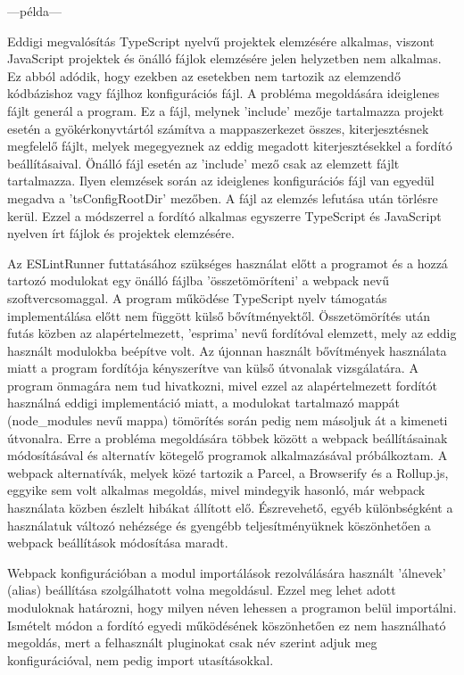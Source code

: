 ---példa---

Eddigi megvalósítás TypeScript nyelvű projektek elemzésére alkalmas, viszont JavaScript projektek és önálló fájlok elemzésére jelen helyzetben nem alkalmas. Ez abból adódik, hogy ezekben az esetekben nem tartozik az elemzendő kódbázishoz vagy fájlhoz konfigurációs fájl. A probléma megoldására ideiglenes fájlt generál a program. Ez a fájl, melynek 'include' mezője tartalmazza projekt esetén a gyökérkonyvtártól számítva a mappaszerkezet összes, kiterjesztésnek megfelelő fájlt, melyek megegyeznek az eddig megadott kiterjesztésekkel a fordító beállításaival. Önálló fájl esetén az 'include' mező csak az elemzett fájlt tartalmazza.
Ilyen elemzések során az ideiglenes konfigurációs fájl van egyedül megadva a 'tsConfigRootDir' mezőben. A fájl az elemzés lefutása után törlésre kerül.
Ezzel a módszerrel a fordító alkalmas egyszerre TypeScript és JavaScript nyelven írt fájlok és projektek elemzésére. 

Az ESLintRunner futtatásához szükséges használat előtt a programot és a hozzá tartozó modulokat egy önálló fájlba 'összetömöríteni' a webpack nevű szoftvercsomaggal. A program működése TypeScript nyelv támogatás implementálása előtt nem függött külső bővítményektől. Összetömörítés után futás közben az alapértelmezett, 'esprima' nevű fordítóval elemzett, mely az eddig használt modulokba beépítve volt. Az újonnan használt bővítmények használata miatt a program fordítója kényszerítve van külső útvonalak vizsgálatára. A program önmagára nem tud hivatkozni, mivel ezzel az alapértelmezett fordítót használná eddigi implementáció miatt, a modulokat tartalmazó mappát (node\_modules nevű mappa) tömörítés során pedig nem másoljuk át a kimeneti útvonalra. Erre a probléma megoldására többek között a webpack beállításainak módosításával és alternatív kötegelő programok alkalmazásával próbálkoztam. A webpack alternatívák, melyek közé tartozik a Parcel, a Browserify és a Rollup.js, eggyike sem volt alkalmas megoldás, mivel mindegyik hasonló, már webpack használata közben észlelt hibákat állított elő. Észrevehető, egyéb különbségként a használatuk változó nehézsége és gyengébb teljesítményüknek köszönhetően a webpack beállítások módosítása maradt.

Webpack konfigurációban a modul importálások rezolválására használt 'álnevek' (alias) beállítása szolgálhatott volna megoldásul. Ezzel meg lehet adott moduloknak határozni, hogy milyen néven lehessen a programon belül importálni. Ismételt módon a fordító egyedi működésének köszönhetően ez nem használható megoldás, mert a felhasznált pluginokat csak név szerint adjuk meg konfigurációval, nem pedig import utasításokkal.

